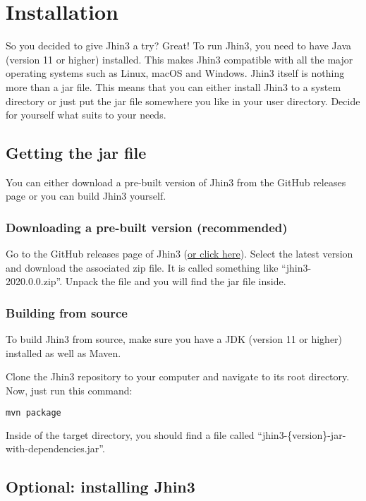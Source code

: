 \section{Installation}

So you decided to give Jhin3 a try? Great!
To run Jhin3, you need to have Java (version 11 or higher) installed. This makes Jhin3 compatible with all the major operating systems such as Linux, macOS and Windows. Jhin3 itself is nothing more than a jar file. This means that you can either install Jhin3 to a system directory or just put the jar file somewhere you like in your user directory. Decide for yourself what suits to your needs.

\subsection{Getting the jar file}

You can either download a pre-built version of Jhin3 from the GitHub releases page or you can build Jhin3 yourself.

\subsubsection{Downloading a pre-built version (recommended)}

Go to the GitHub releases page of Jhin3 (\href{https://github.com/hannesbraun/jhin3/releases}{or click here}). Select the latest version and download the associated zip file. It is called something like ``jhin3-2020.0.0.zip''.
Unpack the file and you will find the jar file inside.

\subsubsection{Building from source}

To build Jhin3 from source, make sure you have a JDK (version 11 or higher) installed as well as Maven.

Clone the Jhin3 repository to your computer and navigate to its root directory. Now, just run this command:
\begin{lstlisting}[language=bash]
mvn package
\end{lstlisting}

Inside of the target directory, you should find a file called ``jhin3-\{version\}-jar-with-dependencies.jar''.

\subsection{Optional: installing Jhin3}

